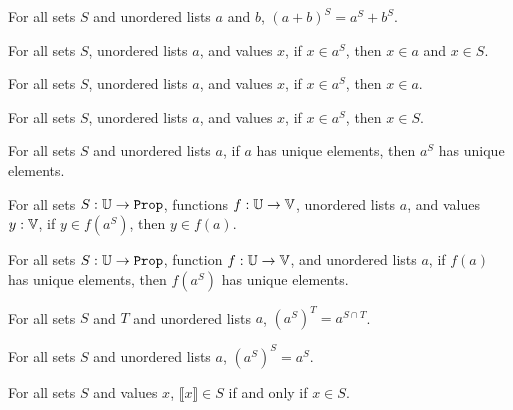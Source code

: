 \documentclass[../../math.tex]{subfiles}
\begin{document}
\begin{theorem}
    For all sets $S$ and unordered lists $a$ and $b$, $(a + b)^S = a^S + b^S$.
\end{theorem}

\begin{lemma} \label{ulist_filter_in_both}
    For all sets $S$, unordered lists $a$, and values $x$, if $x \in a^S$, then
    $x \in a$ and $x \in S$.
\end{lemma}

\begin{theorem} \label{ulist_filter_in}
    For all sets $S$, unordered lists $a$, and values $x$, if $x \in a^S$, then
    $x \in a$.
\end{theorem}

\begin{theorem} \label{ulist_filter_in_set}
    For all sets $S$, unordered lists $a$, and values $x$, if $x \in a^S$, then
    $x \in S$.
\end{theorem}

\begin{theorem} \label{ulist_filter_unique}
    For all sets $S$ and unordered lists $a$, if $a$ has unique elements, then
    $a^S$ has unique elements.
\end{theorem}

\begin{theorem} \label{ulist_filter_image_in}
    For all sets $S : \set{\U}$, functions $f : \mathbb{U} \to \mathbb{V}$, unordered lists $a$,
    and values $y : \mathbb{V}$, if $y \in f(a^S)$, then $y \in f(a)$.
\end{theorem}

\begin{theorem} \label{ulist_filter_image_unique}
    For all sets $S : \set{\U}$, function $f : \mathbb{U} \to \mathbb{V}$, and unordered lists
    $a$, if $f(a)$ has unique elements, then $f(a^S)$ has unique elements.
\end{theorem}

\begin{theorem} \label{ulist_filter_inter}
    For all sets $S$ and $T$ and unordered lists $a$, $(a^S)^T = a^{S \cap T}$.
\end{theorem}

\begin{theorem} \label{ulist_filter_filter}
    For all sets $S$ and unordered lists $a$, $(a^S)^S = a^S$.
\end{theorem}

\begin{theorem}
    For all sets $S$ and values $x$, $\llbracket x\rrbracket \in S$ if and only
    if $x \in S$.
\end{theorem}
\end{document}
